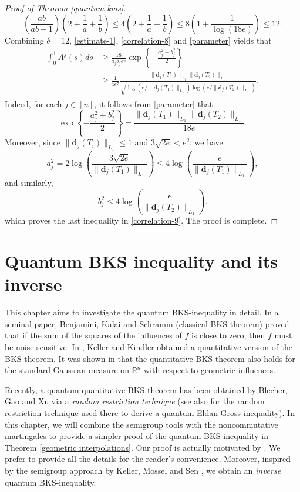 \documentclass{amsbook}
\theoremstyle{definition}
\theoremstyle{remark}
\numberwithin{section}{chapter}
\numberwithin{equation}{chapter}
\newcommand{\1}{\mathbf{1}}
\newcommand{\dc}{\mathbf{d}}
\begin{document}
\begin{proof}[Proof of Theorem \ref{quantum-kms}]
	\[
	\left(\frac{ab}{ab-1}\right)\left(2+\frac{1}{a}+\frac{1}{b}\right)\leq 4\left(2+\frac{1}{a}+\frac{1}{b}\right)\leq 8\left(1+\frac{1}{\log(18e)}\right)\leq 12.
	\]
	Combining $\delta=12$, \eqref{estimate-1}, \eqref{correlation-8} and \eqref{parameter} yields that
	\begin{equation}\label{correlation-9}
	\begin{split}
	\int_0^1 A^{j}(s)ds&\geq \frac{18}{a_{j}b_{j}e^{6}}\exp\left\{-\frac{a^{2}_{j}+b^{2}_{j}}{2}\right\}\\
&\geq 	\frac{1}{4e^7} \frac{\|\dc_{j}(T_1)\|_{L_{1}}\|\dc_{j}(T_2)\|_{L_{1}}}{\sqrt{\log(e/\|\dc_{j}(T_1)\|_{L_{1}})\log(e/\|\dc_{j}(T_2)\|_{L_{1}})}}.
\end{split}
	\end{equation}
Indeed,  for each $j\in[n]$, it follows from \eqref{parameter} that
	\[
	\exp\left\{-\frac{a_j^2+b_j^2}{2}\right\}
	=
	\frac{
		\|\dc_j(T_1)\|_{L_1}
		\|\dc_j(T_2)\|_{L_1}
	}{18e}.
	\]
	Moreover, since
	$\|\dc_j(T_i)\|_{L_1}\leq1$ and $3\sqrt{2e}<e^2$, we have
	\[
	a_j^2
	=
	2\log\left(
	\frac{3\sqrt{2e}}{\|\dc_j(T_1)\|_{L_1}}
	\right)
	\leq
	4\log\left(
	\frac{e}{\|\dc_j(T_1)\|_{L_1}}
	\right),
	\]
	and similarly,
	\[
	b_j^2
	\leq
	4\log\left(
	\frac{e}{\|\dc_j(T_2)\|_{L_{1}}}
	\right).
	\]
	which proves the last inequality in \eqref{correlation-9}. The proof is complete.

\end{proof}

\chapter{Quantum BKS inequality and its inverse}\label{sec-bks}
This chapter aims to investigate the quantum BKS-inequality in detail. In a seminal paper, Benjamini, Kalai and Schramm \cite{BKS1999} (classical BKS theorem) proved that if the sum of the squares of the influences of $f$ is close to zero, then $f$ must be noise sensitive. In \cite{KK2013}, Keller and Kindler obtained a quantitative version of the BKS theorem.  It was shown in \cite{KMS2014} that the quantitative BKS theorem also holds for the standard Gaussian measure on $\mathbb{R}^n$ with respect to geometric influences.

 Recently, a quantum quantitative BKS theorem has been obtained by Blecher, Gao and Xu \cite{BGX2025} via a \emph{random restriction technique} (see also \cite{JLLZ2025} for the random restriction technique used there to derive a quantum Eldan-Gross inequality). In this chapter, we will combine the semigroup tools with the noncommutative martingales to provide a simpler proof of the quantum BKS-inequality in Theorem \ref{geometric interpolations}. Our proof is actually motivated by \cite{JLZ2025}. We prefer to provide all the details for the reader's convenience.  
  Moreover, inspired by the semigroup approach by Keller, Mossel and Sen \cite{KMS2014}, we obtain an \emph{inverse} quantum BKS-inequality.
 
\end{document}
